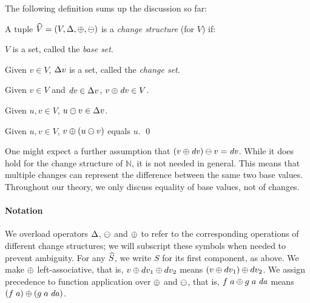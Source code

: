 The following definition sums up the discussion so far:

\begin{definition}
  \label{def:change-struct}
  A tuple $\ChangeStruct{V} = (V, \CHANGE,
  \UPDATE,
  \DIFF)$ is a \emph{change structure} (for $V$) if:

  \begin{subdefinition}
  \item $V$ is a set, called the \emph{base set}.
  \item Given $v \in V$, $\Change{v}$ is a set, called the \emph{change set}.
  \item Given $v \in V$ and $\D v \in \Change{v}$, $\Apply{\D v}{v} \in V$.
    \label{def:update}
  \item Given $u, v \in V$, $\Diff{u}{v} \in \Change{v}$.
    \label{def:diff}
  \item Given $u, v \in V$, $\Apply{\Diff*{u}{v}}{v}$ equals $u$.
    \qed
    \label{def:update-diff}
  \end{subdefinition}
\end{definition}

One might expect a further assumption that
$\Diff{\Apply*{\D v}{v}}{v} = \D v$. While it does hold
for the change structure of $\mathbb{N}$, it is not needed in general.
This means that multiple changes can represent the difference between
the same two base values. Throughout our theory, we only discuss equality of
base values, not of changes.

\paragraph{Notation}
We overload operators $\CHANGE$, $\DIFF$ and $\UPDATE$ to refer
to the corresponding operations of different change structures;
we will subscript these symbols when needed to prevent ambiguity.
For any $\widehat{S}$, we write $S$ for its first component,
as above. We make $\UPDATE$ left-associative, that is,
$\Update{\Update{v}{dv_1}}{dv_2}$ means $\Update{\Update*{v}{dv_1}}{dv_2}$.
We assign precedence to function application over
$\UPDATE$ and $\DIFF$, that is, $\Update{\App{f}{a}}{\App{\App{g}{a}}{\D a}}$ means
$\Update{\App*{f}{a}}{\App*{\App{g}{a}}{\D a}}$.

